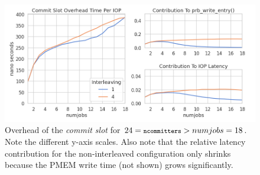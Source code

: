 \documentclass[12pt,a4paper,twoside]{book}
\begin{document}
\begin{figure}[H]
    \centering
    \includegraphics[width=\textwidth]{fig/evaluation/ncommitters_scalability__overhead}
    \caption{
        Overhead of the \textit{commit slot} for $24 = {\footnotesize \texttt{ncommitters}} > numjobs = 18$.
        Note the different y-axis scales.
        Also note that the relative latency contribution for the non-interleaved configuration only shrinks because the PMEM write time (not shown) grows significantly.}
    \label{fig:eval:ncommitters_scalability:overhead}
\end{figure}
\end{document}

